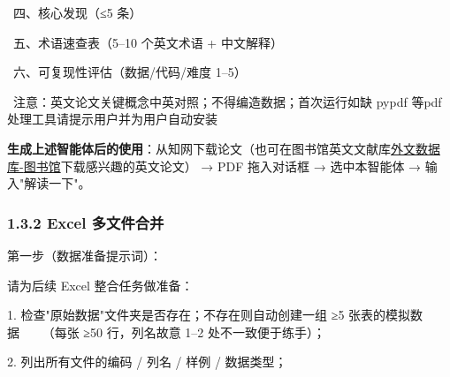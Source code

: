 \documentclass[
  american,
  chinese,
]{ctexart}
\begin{document}
\foreignlanguage{american}{{~}}{四、核心发现（}\foreignlanguage{american}{≤5 }{条）}{ \foreignlanguage{american}{}}

\foreignlanguage{american}{{~}}{五、术语速查表（}\foreignlanguage{american}{5--10 }{{个}}{英文术语}\foreignlanguage{american}{ + }{中文解释）}{ \foreignlanguage{american}{}}

\foreignlanguage{american}{{~}}{六、可复现性评估（数据}\foreignlanguage{american}{/}{代码}\foreignlanguage{american}{/}{难度}\foreignlanguage{american}{ 1--5}{）}\foreignlanguage{american}{{~ }}

\foreignlanguage{american}{{~}}{注意：英文论文关键概念中英对照；不得编造数据；首次运行如缺}\foreignlanguage{american}{ {pypdf} }{等}\foreignlanguage{american}{pdf}{处理工具请提示用户并为用户自动安装}\foreignlanguage{american}{}

\textbf{{生成上述智能体后的使用}}{：{从知网下载}论文（也可在图书馆英文文献库}\foreignlanguage{american}{\href{https://lib.sicau.edu.cn/LibSicau/LanMu/MuLu.asp?id=19}{\foreignlanguage{american}{\foreignlanguage{american}{外文数据库}}{-}\foreignlanguage{american}{\foreignlanguage{american}{图书馆}}}}{下载感兴趣的英文论文）}{ \foreignlanguage{american}{→ PDF }}{拖入对话框}{ \foreignlanguage{american}{→ }}{选中本智能体}{ \foreignlanguage{american}{→ }}{输入}\foreignlanguage{american}{"}{解读一下}\foreignlanguage{american}{"}{。}\foreignlanguage{american}{}

\subsubsection{\texorpdfstring{\foreignlanguage{american}{1.3.2 Excel }{多文件合并}\foreignlanguage{american}{}}{1.3.2 Excel 多文件合并}}\label{excel-ux591aux6587ux4ef6ux5408ux5e76}

{第一步（数据准备提示词）：}\foreignlanguage{american}{}

{请为后续}\foreignlanguage{american}{ Excel }{整合任务做准备：}{ \foreignlanguage{american}{}}

\foreignlanguage{american}{1. }{检查}\foreignlanguage{american}{"}{原始数据}\foreignlanguage{american}{"}{文件夹是否存在；不存在则自动创建一组}\foreignlanguage{american}{ ≥5 }{张表的模拟数据}\foreignlanguage{american}{{~~~ }}{（每张}\foreignlanguage{american}{ ≥50 }{行，列名故意}\foreignlanguage{american}{ 1--2 }{处不一致便于练手）；}{ \foreignlanguage{american}{}}

\foreignlanguage{american}{2. }{列出所有文件的编码}\foreignlanguage{american}{ / }{列名}\foreignlanguage{american}{ / }{样例}\foreignlanguage{american}{ / }{数据类型；}{ \foreignlanguage{american}{}}
\end{document}
